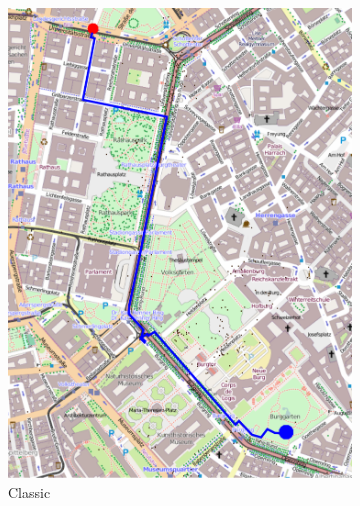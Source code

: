 \documentclass[presentation]{beamer}
\begin{document}
\begin{frame}
\begin{figure}
\begin{subfigure}[b]{0.325\textwidth}
   \includegraphics[width=\textwidth]{img/vcm_nocd2}
   \caption{Classic}
   \label{img:nocrowd}
  \end{subfigure}
  \begin{subfigure}[b]{0.325\textwidth}

\end{subfigure}
\end{figure}
\end{frame}
\end{document}
